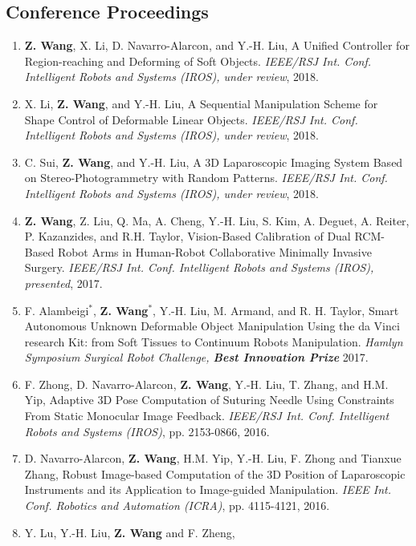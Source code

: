 \documentclass[10pt,letterpaper]{article}
\begin{document}
\subsection*{Conference Proceedings}
\begin{enumerate}
    \item \textbf{Z. Wang}, X. Li, D. Navarro-Alarcon, and Y.-H. Liu,
    A Unified Controller for Region-reaching and Deforming of Soft Objects.
    \textit{{IEEE/RSJ} Int. Conf. Intelligent Robots and Systems (IROS), under review}, 2018.
    \item X. Li, \textbf{Z. Wang}, and Y.-H. Liu,
    A Sequential Manipulation Scheme for Shape Control of Deformable Linear Objects.
    \textit{{IEEE/RSJ} Int. Conf. Intelligent Robots and Systems (IROS), under review}, 2018.
    \item C. Sui, \textbf{Z. Wang}, and Y.-H. Liu,
    A 3D Laparoscopic Imaging System Based on Stereo-Photogrammetry with Random Patterns.
    \textit{{IEEE/RSJ} Int. Conf. Intelligent Robots and Systems (IROS), under review}, 2018.
    \item \textbf{Z. Wang}, Z. Liu, Q. Ma, A. Cheng, Y.-H. Liu, S. Kim, A. Deguet, A. Reiter, P. Kazanzides, and R.H. Taylor,
    Vision-Based Calibration of Dual RCM-Based Robot Arms in Human-Robot Collaborative Minimally Invasive Surgery.
    \textit{{IEEE/RSJ} Int. Conf. Intelligent Robots and Systems (IROS), presented}, 2017.
    \item F. Alambeigi$^*$, \textbf{Z. Wang}$^*$, Y.-H. Liu, M. Armand, and R. H. Taylor,
    Smart Autonomous Unknown Deformable Object Manipulation Using the da Vinci research Kit: from Soft Tissues to Continuum Robots Manipulation.
    \textit{Hamlyn Symposium Surgical Robot Challenge, \textbf{Best Innovation Prize}} 2017.
    \item F. Zhong, D. Navarro-Alarcon, \textbf{Z. Wang}, Y.-H. Liu, T. Zhang, and H.M. Yip,
    Adaptive 3D Pose Computation of Suturing Needle Using Constraints From Static Monocular Image Feedback.
    \textit{{IEEE/RSJ} Int. Conf. Intelligent Robots and Systems (IROS)}, pp. 2153-0866, 2016.
    \item D. Navarro-Alarcon, \textbf{Z. Wang}, H.M. Yip, Y.-H. Liu, F. Zhong and Tianxue Zhang,
    Robust Image-based Computation of the 3D Position of Laparoscopic Instruments and its Application to Image-guided Manipulation.
    \textit{{IEEE} Int. Conf. Robotics and Automation (ICRA)}, pp. 4115-4121, 2016.
    \item Y. Lu, Y.-H. Liu, \textbf{Z. Wang} and F. Zheng,

\end{enumerate}
\end{document}
